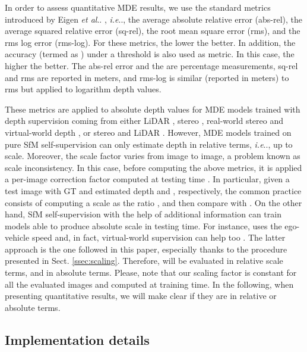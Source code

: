 \documentclass[journal]{IEEEtran}
\makeatletter
\DeclareRobustCommand\onedot{\futurelet\@let@token\@onedot}
\def\@onedot{\ifx\@let@token.\else.\null\fi\xspace}
\def\ie{\emph{i.e}\onedot} \def\Ie{\emph{I.e}\onedot}
\def\etal{\emph{et al}\onedot}
\newcommand{\sSect}[1]{Sect. \ref{ssec:#1}}
\makeatother
\begin{document}
In order to assess quantitative MDE results, we use the standard metrics introduced by Eigen {\etal} \cite{Eigen:2014}, {\ie}, the average absolute relative error (abs-rel), the average squared relative error (sq-rel), the root mean square error (rms), and the rms log error (rms-log). For these metrics, the lower the better. In addition, the accuracy (termed as ) under a threshold  is also used as metric. In this case, the higher the better. The abs-rel error and the  are percentage measurements, sq-rel and rms are reported in meters, and rms-log is similar (reported in meters) to rms but applied to logarithm depth values. 

These metrics are applied to absolute depth values for MDE models trained with depth supervision coming from either LiDAR  \cite{Eigen:2014, Liu:2016, Roy:2016, Laina:2016, Cao:2017, Fu:2018DORN, Gurram:2018, He:2018, Xu:2018, Yin:2019, Guizilini:2020}, stereo \cite{Saxena:2007, Garg:2016, Godard:2017, Godard:2019MonoDepth2, Pillai:2019}, real-world stereo and virtual-world depth \cite{Zhao:2019GASDA, Pnvr:2020SharinGAN}, or stereo and LiDAR \cite{Kuznietsov:2017, He:2018wearable}. 
However, MDE models trained on pure SfM self-supervision can only estimate depth in relative terms, {\ie}, up to scale. Moreover, the scale factor varies from image to image, a problem known as scale inconsistency. In this case, before computing the above metrics, it is applied a per-image correction factor computed at testing time \cite{Zhou:2017, Yin:2018GeoNet, Zhao:2020, Godard:2019MonoDepth2, Guizilini:2020semantic, Cheng:2020S3Net}. In particular, given a test image  with GT and estimated depth  and , respectively, the common practice consists of computing a scale  as the ratio , and then compare  with . On the other hand, SfM self-supervision with the help of additional information can train models able to produce absolute scale in testing time. For instance, \cite{Guizilini:20203D} uses the ego-vehicle speed and, in fact, virtual-world supervision can help too \cite{Zheng:2018T2Net, Kundu:2018AdaDepth}. The latter approach is the one followed in this paper, especially thanks to the procedure presented in \sSect{scaling}. Therefore,  will be evaluated in relative scale terms, and  in absolute terms. Please, note that our  scaling factor is constant for all the evaluated images and computed at training time. In the following, when presenting quantitative results, we will make clear if they are in relative or absolute terms.

\subsection{Implementation details}
\label{ssec:implementation}
\end{document}
